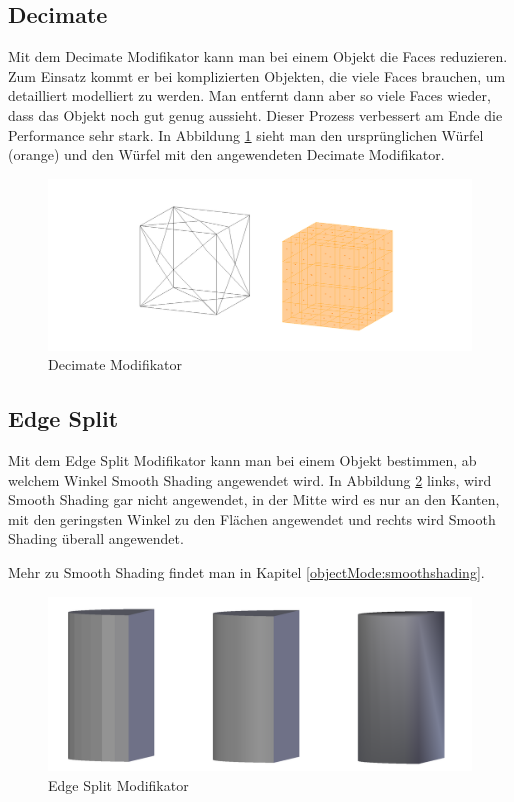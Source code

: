 \subsection{Decimate}\citep{blender:decimate_modifier}
\label{Decimate:heading}
Mit dem Decimate Modifikator kann man bei einem Objekt die Faces reduzieren. Zum Einsatz kommt er bei komplizierten
Objekten, die viele Faces brauchen, um detailliert modelliert zu werden. Man entfernt dann aber so viele Faces
wieder, dass das Objekt noch gut genug aussieht. Dieser Prozess verbessert am Ende die Performance sehr stark.
In Abbildung \ref{modifikatoren:image6} sieht man den ursprünglichen Würfel (orange) und den Würfel mit den angewendeten
Decimate Modifikator.
\begin{figure}[h]
    \centering
    \includegraphics[width=.8\textwidth]{images/Modifikatoren-Decimate.png}
    \caption{Decimate Modifikator}
    \label{modifikatoren:image6}
\end{figure}

\subsection{Edge Split}\citep{blender:edgesplit_modifier}
\label{Edge_Split:heading}
Mit dem Edge Split Modifikator kann man bei einem Objekt bestimmen, ab welchem Winkel Smooth Shading angewendet wird.
In Abbildung \ref{modifikatoren:image7} links, wird Smooth Shading gar nicht angewendet, in der Mitte wird es nur an
den Kanten, mit den geringsten Winkel zu den Flächen angewendet und rechts wird Smooth Shading überall angewendet.

Mehr zu Smooth Shading findet man in Kapitel \ref{objectMode:smoothshading}.
\begin{figure}[h]
    \centering
    \includegraphics[width=.8\textwidth]{images/Modifikatoren-Edgesplit.png}
    \caption{Edge Split Modifikator}
    \label{modifikatoren:image7}
\end{figure}